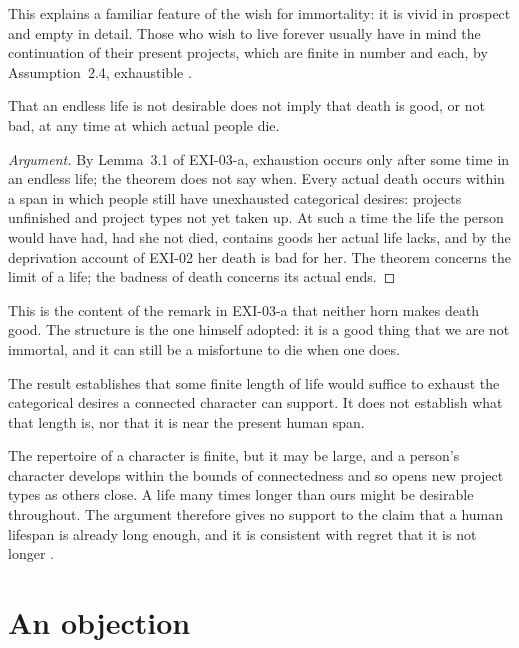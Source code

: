 \documentclass{situationist-preprint}
\begin{document}
This explains a familiar feature of the wish for immortality: it is vivid in prospect and empty in detail. Those who wish to live forever usually have in mind the continuation of their present projects, which are finite in number and each, by Assumption~2.4, exhaustible \citep{Williams1973}.

\begin{proposition}\label{p:death}
That an endless life is not desirable does not imply that death is good, or not bad, at any time at which actual people die.
\end{proposition}

\begin{proof}[Argument]
By Lemma~3.1 of EXI-03-a, exhaustion occurs only after some time in an endless life; the theorem does not say when. Every actual death occurs within a span in which people still have unexhausted categorical desires: projects unfinished and project types not yet taken up. At such a time the life the person would have had, had she not died, contains goods her actual life lacks, and by the deprivation account of EXI-02 her death is bad for her. The theorem concerns the limit of a life; the badness of death concerns its actual ends.
\end{proof}

This is the content of the remark in EXI-03-a that neither horn makes death good. The structure is the one \citet{Williams1973} himself adopted: it is a good thing that we are not immortal, and it can still be a misfortune to die when one does.

\begin{proposition}\label{p:length}
The result establishes that some finite length of life would suffice to exhaust the categorical desires a connected character can support. It does not establish what that length is, nor that it is near the present human span.
\end{proposition}

The repertoire of a character is finite, but it may be large, and a person's character develops within the bounds of connectedness and so opens new project types as others close. A life many times longer than ours might be desirable throughout. The argument therefore gives no support to the claim that a human lifespan is already long enough, and it is consistent with regret that it is not longer \citep{Fischer1994}.

\section{An objection}
\end{document}
